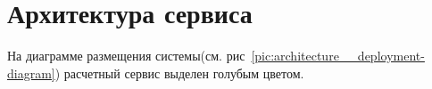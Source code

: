 \section*{\large{Архитектура сервиса}}

На диаграмме размещения системы(см. рис\ \ref{pic:architecture__deployment-diagram})
расчетный сервис выделен голубым цветом.

